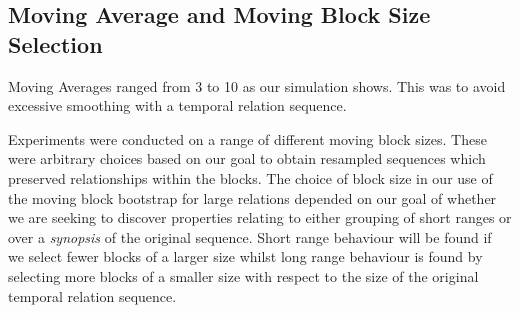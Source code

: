 \subsection{Moving Average and Moving Block Size Selection}

Moving Averages ranged from 3 to 10 as our simulation shows. This was
to avoid excessive smoothing with a temporal relation sequence.

\smallskip

Experiments were conducted on a range of different moving block
sizes. These were arbitrary choices based on our goal to obtain
resampled sequences which preserved relationships within the
blocks. The choice of block size in our use of the moving block
bootstrap for large relations depended on our goal of whether we are
seeking to discover properties relating to either grouping of short
ranges or over a {\em synopsis} of the original sequence. Short range
behaviour will be found if we select fewer blocks of a larger size
whilst long range behaviour is found by selecting more blocks of a
smaller size with respect to the size of the original temporal
relation sequence. 








